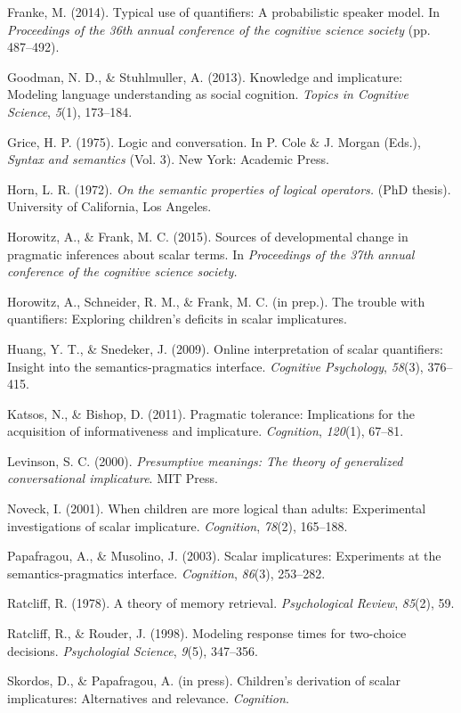 \documentclass[10pt, letterpaper]{article}
\begin{document}
Franke, M. (2014). Typical use of quantifiers: A probabilistic speaker
model. In \emph{Proceedings of the 36th annual conference of the
cognitive science society} (pp. 487--492).

Goodman, N. D., \& Stuhlmuller, A. (2013). Knowledge and implicature:
Modeling language understanding as social cognition. \emph{Topics in
Cognitive Science}, \emph{5}(1), 173--184.

Grice, H. P. (1975). Logic and conversation. In P. Cole \& J. Morgan
(Eds.), \emph{Syntax and semantics} (Vol. 3). New York: Academic Press.

Horn, L. R. (1972). \emph{On the semantic properties of logical
operators.} (PhD thesis). University of California, Los Angeles.

Horowitz, A., \& Frank, M. C. (2015). Sources of developmental change in
pragmatic inferences about scalar terms. In \emph{Proceedings of the
37th annual conference of the cognitive science society.}

Horowitz, A., Schneider, R. M., \& Frank, M. C. (in prep.). The trouble
with quantifiers: Exploring children's deficits in scalar implicatures.

Huang, Y. T., \& Snedeker, J. (2009). Online interpretation of scalar
quantifiers: Insight into the semantics-pragmatics interface.
\emph{Cognitive Psychology}, \emph{58}(3), 376--415.

Katsos, N., \& Bishop, D. (2011). Pragmatic tolerance: Implications for
the acquisition of informativeness and implicature. \emph{Cognition},
\emph{120}(1), 67--81.

Levinson, S. C. (2000). \emph{Presumptive meanings: The theory of
generalized conversational implicature}. MIT Press.

Noveck, I. (2001). When children are more logical than adults:
Experimental investigations of scalar implicature. \emph{Cognition},
\emph{78}(2), 165--188.

Papafragou, A., \& Musolino, J. (2003). Scalar implicatures: Experiments
at the semantics-pragmatics interface. \emph{Cognition}, \emph{86}(3),
253--282.

Ratcliff, R. (1978). A theory of memory retrieval. \emph{Psychological
Review}, \emph{85}(2), 59.

Ratcliff, R., \& Rouder, J. (1998). Modeling response times for
two-choice decisions. \emph{Psychologial Science}, \emph{9}(5),
347--356.

Skordos, D., \& Papafragou, A. (in press). Children's derivation of
scalar implicatures: Alternatives and relevance. \emph{Cognition}.
\end{document}
